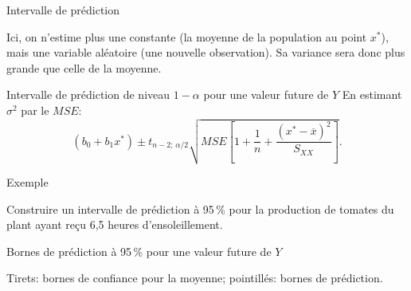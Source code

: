 \documentclass{BeamerTemplate}
\def\bzero{1.37242}
\def\bun{0.43126}
\def\mse{0.32278}
\def\tq{2.0017}
\begin{document}
\begin{frame}[t]{Intervalle de prédiction}

Ici, on n'estime plus une constante (la moyenne de la population au point $x^*$),
mais une \alert{variable aléatoire} (une nouvelle observation). Sa variance sera
donc plus grande que celle de la moyenne.

\begin{Boite}{Intervalle de prédiction de niveau $1-\alpha$ pour une valeur future de $Y$}
En estimant $\sigma^2$ par le $MSE$:
\[
(b_0+b_1x^*)\pm t_{n-2;\,\alpha/2}\sqrt{MSE\left[1+\frac1n
+\frac{(x^*-\overline{x})^2}{S_{XX}}\right]}.
\]
\end{Boite}

\end{frame}

\begin{frame}[t]{Exemple}

Construire un intervalle de prédiction à 95\,\% pour la production de tomates
du plant ayant reçu 6,5 heures d'ensoleillement.

\vspace{5cm}

\end{frame}

\begin{frame}[t]{Bornes de prédiction à 95\,\% pour une valeur future de $Y$}

\begin{center}
\end{center}

{\scriptsize Tirets: bornes de confiance pour la moyenne; pointillés: bornes de
prédiction.}

\end{frame}
\end{document}
